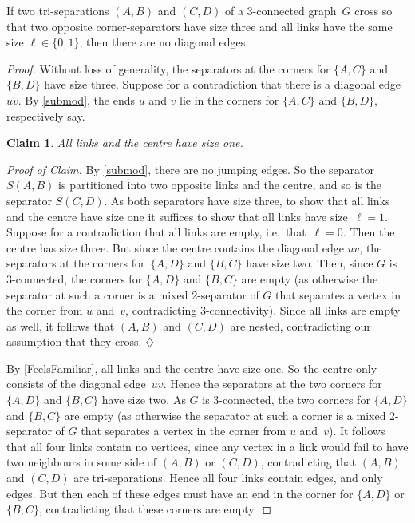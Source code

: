 \documentclass{aic}
\newenvironment{cproof}{\noindent\textit{Proof of Claim.}}{\phantom{!}\!\hfill$\diamondsuit$}
\theoremstyle{plain}
\newtheorem{sublem}{Claim}[thm]
\theoremstyle{definition}
\theoremstyle{plain}
\theoremstyle{plain}
\begin{document}
\begin{lem}\label{noDiagonalEdges}
If two tri-separations $(A,B)$ and $(C,D)$ of a 3-connected graph~$G$ cross so that two opposite corner-separators have size three and all links have the same size $\ell\in\{0,1\}$, then there are no diagonal edges.
\end{lem}
\begin{proof}
Without loss of generality, the separators at the corners for $\{A,C\}$ and $\{B,D\}$ have size three.
Suppose for a contradiction that there is a diagonal edge~$uv$.
By \autoref{submod}, the ends $u$ and $v$ lie in the corners for $\{A,C\}$ and $\{B,D\}$, respectively say.

\begin{sublem}\label{FeelsFamiliar}
All links and the centre have size one.
\end{sublem}
\begin{cproof}
By \autoref{submod}, there are no jumping edges.
So the separator $S(A,B)$ is partitioned into two opposite links and the centre, and so is the separator $S(C,D)$.
As both separators have size three, to show that all links and the centre have size one it suffices to show that all links have size~$\ell=1$.
Suppose for a contradiction that all links are empty, i.e.\ that~$\ell=0$.
Then the centre has size three.
But since the centre contains the diagonal edge $uv$, the separators at the corners for~$\{A,D\}$ and $\{B,C\}$ have size two. 
Then, since $G$ is 3-connected, the corners for $\{A,D\}$ and $\{B,C\}$ are empty (as otherwise the separator at such a corner is a mixed 2-separator of $G$ that separates a vertex in the corner from $u$ and~$v$, contradicting 3-connectivity).
Since all links are empty as well, it follows that $(A,B)$ and $(C,D)$ are nested, contradicting our assumption that they cross.
\end{cproof}\medskip

By \autoref{FeelsFamiliar}, all links and the centre have size one.
So the centre only consists of the diagonal edge~$uv$.
Hence the separators at the two corners for $\{A,D\}$ and $\{B,C\}$ have size two.
As $G$ is 3-connected, the two corners for $\{A,D\}$ and $\{B,C\}$ are empty (as otherwise the separator at such a corner is a mixed 2-separator of $G$ that separates a vertex in the corner from $u$ and~$v$).
It follows that all four links contain no vertices, since any vertex in a link would fail to have two neighbours in some side of $(A,B)$ or $(C,D)$, contradicting that $(A,B)$ and $(C,D)$ are tri-separations.
Hence all four links contain edges, and only edges.
But then each of these edges must have an end in the corner for $\{A,D\}$ or $\{B,C\}$, contradicting that these corners are empty.
\end{proof}
\end{document}
